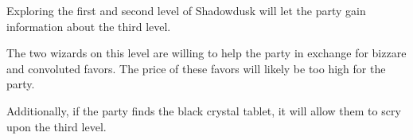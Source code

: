 Exploring the first and second level of Shadowdusk will let the party gain information about the third level.

The two wizards on this level are willing to help the party in exchange for bizzare and convoluted favors.
The price of these favors will likely be too high for the party.

Additionally, if the party finds the black crystal tablet, it will allow them to scry upon the third level.